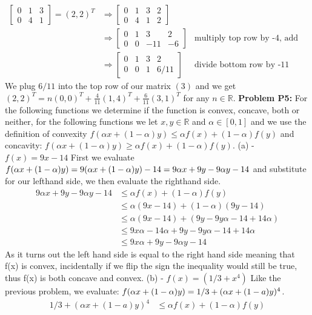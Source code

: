 \documentclass{article}
\begin{document}
\begin{align}
    \begin{bmatrix}
        0 & 1 & 3 \\
        0 & 4 & 1
    \end{bmatrix}
    = (2,2)^T & \Rightarrow 
    \begin{bmatrix}
        0 & 1 & 3 & 2 \\
        0 & 4 & 1 & 2   
    \end{bmatrix} \\ 
    & \Rightarrow
    \begin{bmatrix}
        0 & 1 & 3 & 2 \\
        0 & 0 & -11 & -6 
    \end{bmatrix} & \text{multiply top row by -4, add to bottom row } \\ & \Rightarrow
    \begin{bmatrix}
        0 & 1 & 3 & 2 \\
        0 & 0 & 1 & 6/11
    \end{bmatrix} & \text{divide bottom row by -11}
\end{align}
We plug $6/11$ into the top row of our matrix $(3)$ and we get $(2,2)^T = n(0, 0)^T + \frac{4}{11}(1,4)^T + \frac{6}{11}(3,1)^T$
for any $n \in \mathbb{R}$.
\newline
\break
\textbf{Problem P5:} For the following functions we determine if the function is convex, concave, both or neither, for the following functions we let $x,y \in \mathbb{R}$ and $\alpha \in [0,1]$ and we use the definition of convexity $f(\alpha x + (1 - \alpha)y) \leq \alpha f(x) + (1 - \alpha)f(y)$ and concavity: $f(\alpha x + (1 - \alpha)y) \geq \alpha f(x) + (1 - \alpha)f(y)$.
\newline
\break
(a) - \underline{$f(x) = 9x - 14$} \qquad First we evaluate $f(\alpha x + (1 - \alpha)y) = 9(\alpha x + (1 - \alpha)y) - 14  \\ = 9 \alpha x + 9y - 9 \alpha y - 14$ and substitute for our lefthand side, we then evaluate the righthand side. 
\begin{align*}
    9 \alpha x + 9y - 9 \alpha y - 14 & \leq \alpha f(x) + (1 - \alpha)f(y) \\
    & \leq \alpha (9x-14) + (1 - \alpha)(9y-14) \\
    & \leq \alpha (9x-14) + (9y - 9y \alpha - 14 + 14 \alpha) \\
    & \leq 9x \alpha - 14 \alpha + 9y - 9y \alpha - 14 + 14 \alpha \\
    & \leq 9x \alpha + 9y - 9 \alpha y - 14
\end{align*}
As it turns out the left hand side is equal to the right hand side meaning that f(x) is convex, incidentally if we flip the sign the inequality would still be true, thus f(x) is both concave and convex.
\newline
\break
(b) - \underline{$f(x) = (1/3+x^4)$} \qquad Like the previous problem, we evaluate: $f(\alpha x + (1 - \alpha)y) \newline = 1/3 + (\alpha x + (1 - a)y)^4$.
\begin{align*}
    1/3 + (\alpha x + (1 - a)y)^4 & \leq \alpha f(x) + (1 - \alpha)f(y)
\end{align*}
\end{document}
